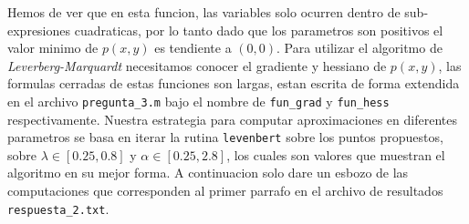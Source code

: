 \documentclass[letterpaper]{article}
\begin{document}
Hemos de ver que en esta funcion, las variables solo ocurren dentro de
sub-expresiones cuadraticas, por lo tanto dado que los parametros son
positivos el valor minimo de \(p(x,y)\) es tendiente a \((0,0)\). Para
utilizar el algoritmo de \emph{Leverberg-Marquardt} necesitamos conocer
el gradiente y hessiano de \(p(x,y)\), las formulas cerradas de estas
funciones son largas, estan escrita de forma extendida en el archivo
\texttt{pregunta\_3.m} bajo el nombre de \texttt{fun\_grad} y
\texttt{fun\_hess} respectivamente. Nuestra estrategia para computar
aproximaciones en diferentes parametros se basa en iterar la rutina
\texttt{levenbert} sobre los puntos propuestos, sobre \(\lambda \in
[0.25, 0.8]\) y \(\alpha \in [0.25, 2.8]\), los cuales son valores que
muestran el algoritmo en su mejor forma. A continuacion solo dare un
esbozo de las computaciones que corresponden al primer parrafo en el
archivo de resultados \texttt{respuesta\_2.txt}.
\end{document}
